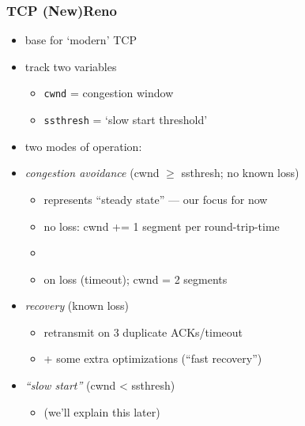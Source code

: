 \begin{frame}
\frametitle{TCP (New)Reno}
\begin{itemize}
    \item base for `modern' TCP
    \item track two variables
        \begin{itemize}
        \item \texttt{cwnd} = congestion window
        \item \texttt{ssthresh} = `slow start threshold'
        \end{itemize}
    \item two modes of operation:
    \item \textit{congestion avoidance} (cwnd $\ge$ ssthresh; no known loss)
        \begin{itemize}
        \item represents ``steady state'' --- our focus for now
        \item no loss: cwnd += 1 segment per round-trip-time
        \item {}
        \item on loss (timeout); cwnd = 2 segments
        \end{itemize}
    \item \textit{recovery} (known loss)
        \begin{itemize}
        \item retransmit on 3 duplicate ACKs/timeout
        \item + some extra optimizations (``fast recovery'')
        \end{itemize}
    \item \textit{``slow start''} (cwnd < ssthresh)
        \begin{itemize}
        \item (we'll explain this later)
        \end{itemize}
    \end{itemize}
\end{frame}
